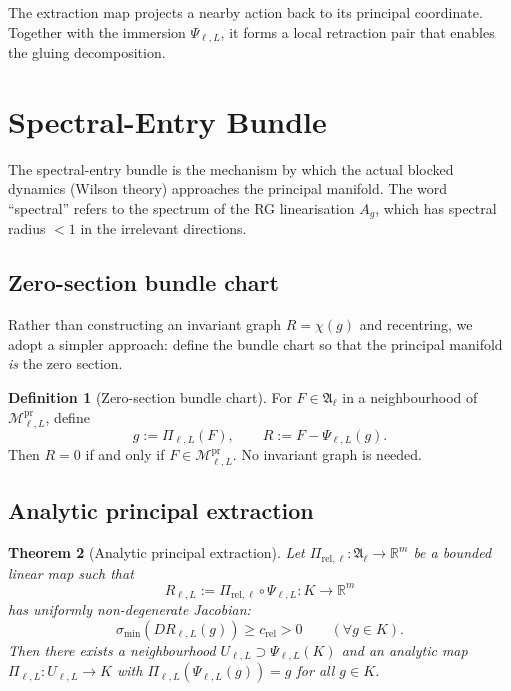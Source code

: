 \documentclass[12pt]{article}
\theoremstyle{plain}
\newtheorem{theorem}{Theorem}[section]
\theoremstyle{definition}
\newtheorem{definition}[theorem]{Definition}
\numberwithin{equation}{section}
\newcommand{\R}{\mathbb{R}}
\newcommand{\fA}{\mathfrak{A}}
\newcommand{\pr}{\mathrm{pr}}
\begin{document}
The extraction map projects a nearby action back to its principal coordinate.  Together with the immersion $\Psi_{\ell,L}$, it forms a local retraction pair that enables the gluing decomposition.

\section{Spectral-Entry Bundle}\label{sec:spectralentry}

The spectral-entry bundle is the mechanism by which the actual blocked dynamics (Wilson theory) approaches the principal manifold.  The word ``spectral'' refers to the spectrum of the RG linearisation $A_g$, which has spectral radius $<1$ in the irrelevant directions.

\subsection{Zero-section bundle chart}

Rather than constructing an invariant graph $R=\chi(g)$ and recentring, we adopt a simpler approach: define the bundle chart so that the principal manifold \emph{is} the zero section.

\begin{definition}[Zero-section bundle chart]
For $F\in\fA_\ell$ in a neighbourhood of $\mathcal{M}^{\pr}_{\ell,L}$, define
\begin{equation}
g := \Pi_{\ell,L}(F),\qquad R := F-\Psi_{\ell,L}(g).
\end{equation}
Then $R=0$ if and only if $F\in\mathcal{M}^{\pr}_{\ell,L}$.  No invariant graph is needed.
\end{definition}

\subsection{Analytic principal extraction}

\begin{theorem}[Analytic principal extraction]\label{thm:extraction}
Let $\Pi_{\mathrm{rel},\ell}:\fA_\ell\to\R^m$ be a bounded linear map such that
\begin{equation}
R_{\ell,L}:=\Pi_{\mathrm{rel},\ell}\circ\Psi_{\ell,L}:K\to\R^m
\end{equation}
has uniformly non-degenerate Jacobian:
\begin{equation}
\sigma_{\min}(DR_{\ell,L}(g))\geq c_{\mathrm{rel}}>0\qquad(\forall g\in K).
\end{equation}
Then there exists a neighbourhood $U_{\ell,L}\supset\Psi_{\ell,L}(K)$ and an analytic map $\Pi_{\ell,L}:U_{\ell,L}\to K$ with $\Pi_{\ell,L}(\Psi_{\ell,L}(g))=g$ for all $g\in K$.
\end{theorem}
\end{document}
